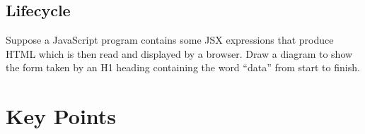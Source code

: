 \subsection*{Lifecycle}
Suppose a JavaScript program contains some JSX expressions that produce HTML
which is then read and displayed by a browser.
Draw a diagram to show the form taken by an H1 heading containing the word ``data''
from start to finish.

\section*{Key Points}


